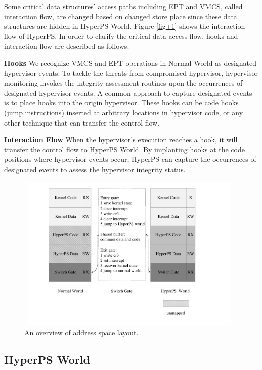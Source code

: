\documentclass[conference]{IEEEtran}
\begin{document}
Some critical data structures' access paths including EPT and VMCS, called interaction flow, are changed based on changed store place since these data structures are hidden in HyperPS World. Figure \ref{fig+1} shows the interaction flow of HyperPS. In order to clarify the critical data access flow, hooks and interaction flow are described as follows.

\textbf{Hooks}
We recognize VMCS and EPT operations in Normal World as designated hypervisor events.
To tackle the threats from compromised hypervisor, hypervisor monitoring invokes the integrity assessment routines upon the occurrences of designated hypervisor events. A common approach to capture designated events is to place hooks into the origin hypervisor. These hooks can be code hooks (jump instructions) inserted at arbitrary locations in hypervisor code, or any other technique that can transfer the control flow.

\textbf{Interaction Flow}
When the hypervisor's execution reaches a hook, it will transfer the control flow to HyperPS World. By implanting hooks at the code positions where hypervisor events occur, HyperPS can capture the occurrences of designated events to assess the hypervisor integrity status.




\begin{figure}
\centerline{\includegraphics[width=11cm, height=7.5cm]{HyperPSLayout.pdf}}%
\caption{An overview of address space layout.} \label{fig2}
\end{figure}



\subsection{HyperPS World} \label {HWorld}
\end{document}
